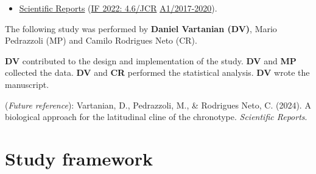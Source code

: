 \documentclass[
  12pt,
  a4paper,
  oneside]{tesesusp}
\providecommand{\tightlist}{%
  \setlength{\itemsep}{0pt}\setlength{\parskip}{0pt}}\usepackage{longtable,booktabs,array}
\begin{document}
\begin{tcolorbox}[enhanced jigsaw, breakable, colback=white, colbacktitle=quarto-callout-note-color!10!white, leftrule=.75mm, left=2mm, toprule=.15mm, opacityback=0, rightrule=.15mm, title=\textcolor{quarto-callout-note-color}{\faInfo}\hspace{0.5em}{Target}, opacitybacktitle=0.6, bottomtitle=1mm, titlerule=0mm, toptitle=1mm, coltitle=black, colframe=quarto-callout-note-color-frame, bottomrule=.15mm, arc=.35mm]

\begin{itemize}
\tightlist
\item
  \href{https://www.nature.com/srep/author-instructions}{Scientific
  Reports} (\href{https://jcr.clarivate.com/jcr/}{IF 2022: 4.6/JCR}
  \textbar{}
  \href{https://sucupira.capes.gov.br/sucupira/public/consultas/coleta/veiculoPublicacaoQualis/listaConsultaGeralPeriodicos.jsf}{A1/2017-2020}).
\end{itemize}

\end{tcolorbox}

\begin{tcolorbox}[enhanced jigsaw, breakable, colback=white, colbacktitle=quarto-callout-note-color!10!white, leftrule=.75mm, left=2mm, toprule=.15mm, opacityback=0, rightrule=.15mm, title=\textcolor{quarto-callout-note-color}{\faInfo}\hspace{0.5em}{Note}, opacitybacktitle=0.6, bottomtitle=1mm, titlerule=0mm, toptitle=1mm, coltitle=black, colframe=quarto-callout-note-color-frame, bottomrule=.15mm, arc=.35mm]

The following study was performed by \textbf{Daniel Vartanian (DV)},
Mario Pedrazzoli (MP) and Camilo Rodrigues Neto (CR).

\textbf{DV} contributed to the design and implementation of the study.
\textbf{DV} and \textbf{MP} collected the data. \textbf{DV} and
\textbf{CR} performed the statistical analysis. \textbf{DV} wrote the
manuscript.

(\emph{Future reference}): Vartanian, D., Pedrazzoli, M., \& Rodrigues
Neto, C. (2024). A biological approach for the latitudinal cline of the
chronotype. \emph{Scientific Reports}.

\end{tcolorbox}

\vspace{10pt}

\hypertarget{study-framework-4}{%
\section{Study framework}\label{study-framework-4}}
\end{document}
